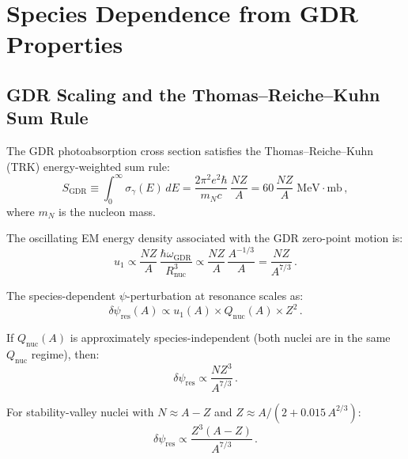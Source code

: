 \documentclass[aps,prd,twocolumn,superscriptaddress,nofootinbib]{revtex4-2}
\newcommand{\dpsi}{\delta\psi}
\newcommand{\Qnuc}{Q_{\mathrm{nuc}}}
\newcommand{\wGDR}{\omega_{\mathrm{GDR}}}
\newcommand{\Rnuc}{R_{\mathrm{nuc}}}
\newcommand{\SGDR}{S_{\mathrm{GDR}}}
\begin{document}
\section{Species Dependence from GDR Properties}
\label{sec:species}

\subsection{GDR Scaling and the Thomas--Reiche--Kuhn Sum Rule}
\label{sec:trk}

The GDR photoabsorption cross section satisfies the Thomas--Reiche--Kuhn
(TRK) energy-weighted sum rule:
\begin{equation}\label{eq:trk}
\SGDR \equiv \int_0^\infty \sigma_\gamma(E)\,dE
= \frac{2\pi^2 e^2\hbar}{m_N c}\,\frac{NZ}{A}
= 60\,\frac{NZ}{A}\;\mathrm{MeV\cdot mb}\,,
\end{equation}
where $m_N$ is the nucleon mass.

The oscillating EM energy density associated with the GDR zero-point
motion is:
\begin{equation}\label{eq:u1-gdr}
u_1 \propto \frac{NZ}{A}\,\frac{\hbar\wGDR}{\Rnuc^3}
\propto \frac{NZ}{A}\,\frac{A^{-1/3}}{A}
= \frac{NZ}{A^{7/3}}\,.
\end{equation}

The species-dependent $\psi$-perturbation at resonance scales as:
\begin{equation}\label{eq:dpsi-species}
\dpsi_{\mathrm{res}}(A) \propto u_1(A) \times \Qnuc(A)
\times Z^2\,.
\end{equation}

If $\Qnuc(A)$ is approximately species-independent (both nuclei are
in the same $\Qnuc$ regime), then:
\begin{equation}
\dpsi_{\mathrm{res}} \propto \frac{NZ^3}{A^{7/3}}\,.
\end{equation}

For stability-valley nuclei with $N \approx A - Z$ and
$Z \approx A/(2 + 0.015\,A^{2/3})$:
\begin{equation}
\dpsi_{\mathrm{res}} \propto \frac{Z^3(A-Z)}{A^{7/3}}\,.
\end{equation}
\end{document}
